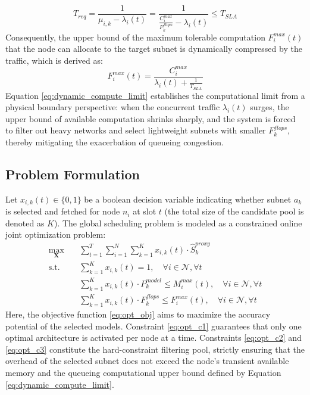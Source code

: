 \documentclass[conference]{IEEEtran}
\begin{document}
\begin{equation}
    T_{req} = \frac{1}{\mu_{i,k} - \lambda_i(t)} = \frac{1}{\frac{C_i^{max}}{F_k^{flops}} - \lambda_i(t)} \le T_{SLA}
\label{eq:sla}
\end{equation}
Consequently, the upper bound of the maximum tolerable computation $F_i^{max}(t)$ that the node can allocate to the target subnet is dynamically compressed by the traffic, which is derived as:
\begin{equation}
F_i^{max}(t) = \frac{C_i^{max}}{\lambda_i(t) + \frac{1}{T_{SLA}}}
\label{eq:dynamic_compute_limit}
\end{equation}
Equation \eqref{eq:dynamic_compute_limit} establishes the computational limit from a physical boundary perspective: when the concurrent traffic $\lambda_i(t)$ surges, the upper bound of available computation shrinks sharply, and the system is forced to filter out heavy networks and select lightweight subnets with smaller $F_k^{flops}$, thereby mitigating the exacerbation of queueing congestion.
\subsection{Problem Formulation}
Let $x_{i,k}(t) \in \{0, 1\}$ be a boolean decision variable indicating whether subnet $a_k$ is selected and fetched for node $n_i$ at slot $t$ (the total size of the candidate pool is denoted as $K$). The global scheduling problem is modeled as a constrained online joint optimization problem:
\begin{align}
\max_{\mathbf{X}} \quad & \sum_{t=1}^{T} \sum_{i=1}^{N} \sum_{k=1}^{K} x_{i,k}(t) \cdot \widehat{S}_k^{proxy} \label{eq:opt_obj} \\
\text{s.t.} \quad & \sum_{k=1}^{K} x_{i,k}(t) = 1, \quad \forall i \in \mathcal{N}, \forall t \label{eq:opt_c1} \\
& \sum_{k=1}^{K} x_{i,k}(t) \cdot P_k^{model} \le M_i^{max}(t), \quad \forall i \in \mathcal{N}, \forall t \label{eq:opt_c2} \\
& \sum_{k=1}^{K} x_{i,k}(t) \cdot F_k^{flops} \le F_i^{max}(t), \quad \forall i \in \mathcal{N}, \forall t \label{eq:opt_c3}
\end{align}
Here, the objective function \eqref{eq:opt_obj} aims to maximize the accuracy potential of the selected models. Constraint \eqref{eq:opt_c1} guarantees that only one optimal architecture is activated per node at a time. Constraints \eqref{eq:opt_c2} and \eqref{eq:opt_c3} constitute the hard-constraint filtering pool, strictly ensuring that the overhead of the selected subnet does not exceed the node's transient available memory and the queueing computational upper bound defined by Equation \eqref{eq:dynamic_compute_limit}.
\end{document}
